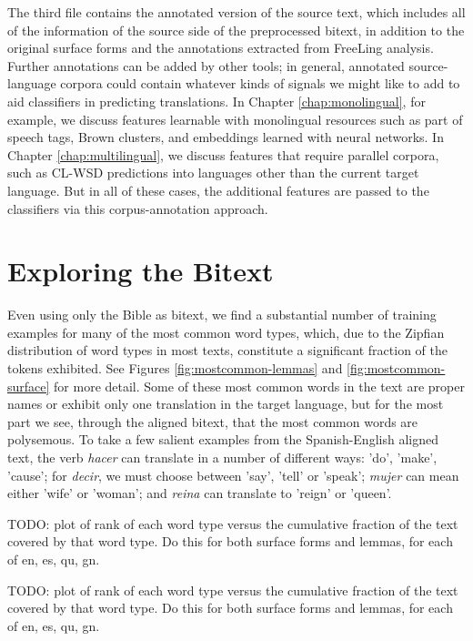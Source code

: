 The third file contains the annotated version of the source text, which
includes all of the information of the source side of the preprocessed bitext,
in addition to the original surface forms and the annotations extracted from
FreeLing analysis. Further annotations can be added by other tools; in general,
annotated source-language corpora could contain whatever kinds of signals we
might like to add to aid classifiers in predicting translations. In Chapter
\ref{chap:monolingual}, for example, we discuss features learnable with
monolingual resources such as part of speech tags, Brown clusters, and
embeddings learned with neural networks. In Chapter \ref{chap:multilingual}, we
discuss features that require parallel corpora, such as CL-WSD predictions into
languages other than the current target language. But in all of these cases,
the additional features are passed to the classifiers via this
corpus-annotation approach.


\section{Exploring the Bitext}
\label{sec:exploring}
Even using only the Bible as bitext, we find a substantial number of
training examples for many of the most common word types, which, due to the
Zipfian distribution of word types in most texts, constitute a significant
fraction of the tokens exhibited. See Figures \ref{fig:mostcommon-lemmas} and
\ref{fig:mostcommon-surface} for more detail.
Some of these most common words
in the text are proper names or exhibit only one translation in the target
language, but for the most part we see, through the aligned bitext, that
the most common words are polysemous.
To take a few salient examples from the Spanish-English aligned text,
the verb \emph{hacer} can translate in a number of different ways: 'do',
'make', 'cause'; for \emph{decir}, we must choose between 'say', 'tell' or
'speak'; \emph{mujer} can mean either 'wife' or 'woman'; and \emph{reina} can
translate to 'reign' or 'queen'.  

\begin{figure*}
TODO: plot of rank of each word type versus the cumulative fraction of the text
covered by that word type. Do this for both surface forms and lemmas, for each
of en, es, qu, gn.
  \caption{Word ranks versus fraction of Bible tokens covered, for lemmas.}
  \label{fig:mostcommon-lemmas}
\end{figure*}

\begin{figure*}
TODO: plot of rank of each word type versus the cumulative fraction of the text
covered by that word type. Do this for both surface forms and lemmas, for each
of en, es, qu, gn.
  \caption{Word ranks versus fraction of Bible tokens covered, for
  (case-insensitive) surface forms.}
  \label{fig:mostcommon-lemmas}
\end{figure*}


